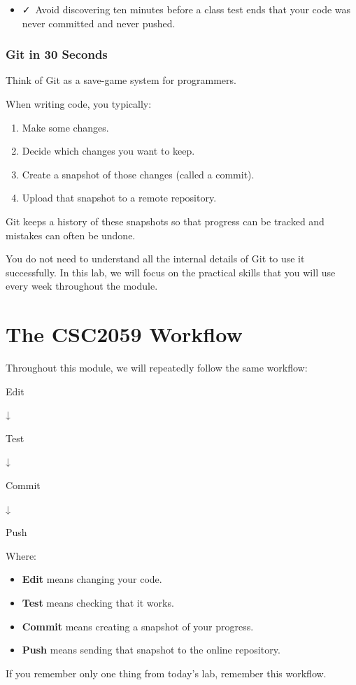 \documentclass{csc2059practical}
\begin{document}
\begin{itemize}
  \item \faCheck\ Avoid discovering ten minutes before a class test ends that your code was never committed and never pushed.
\end{itemize}
\subsubsection{Git in 30 Seconds}
Think of Git as a save-game system for programmers.

When writing code, you typically:

\begin{enumerate}
  \item Make some changes.
  \item Decide which changes you want to keep.
  \item Create a snapshot of those changes (called a commit).
  \item Upload that snapshot to a remote repository.
\end{enumerate}
Git keeps a history of these snapshots so that progress can be tracked and mistakes can often be undone.

You do not need to understand all the internal details of Git to use it successfully. In this lab, we will focus on the practical skills that you will use every week throughout the module.

\section{The CSC2059 Workflow}
\begin{workflowreminder}
Throughout this module, we will repeatedly follow the same workflow:

Edit

↓

Test

↓

Commit

↓

Push

Where:

\begin{itemize}
  \item \textbf{Edit} means changing your code.
  \item \textbf{Test} means checking that it works.
  \item \textbf{Commit} means creating a snapshot of your progress.
  \item \textbf{Push} means sending that snapshot to the online repository.
\end{itemize}
If you remember only one thing from today's lab, remember this workflow.

\end{workflowreminder}
\end{document}
